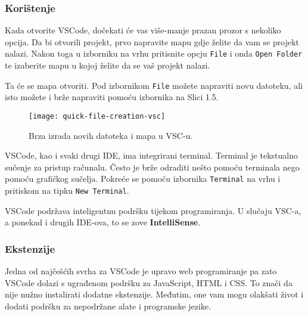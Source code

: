 \subsubsection{Korištenje}

Kada otvorite VSCode, dočekati će vas više-manje prazan prozor s nekoliko opcija.
Da bi otvorili projekt, prvo napravite mapu gdje želite da vam se projekt nalazi.
Nakon toga u izborniku na vrhu pritisnite opcju \verb|File| i onda \verb|Open Folder| te izaberite mapu u kojoj želite da se vaš projekt nalazi.

Ta će se mapa otvoriti.
Pod izbornikom \verb|File| možete napraviti novu datoteku, ali isto možete i brže napraviti pomoću izbornika na Slici 1.5.
\begin{figure}[h]
    \centering
    \texttt{[image: quick-file-creation-vsc]}
    \caption{Brza izrada novih datoteka i mapa u VSC-u.}\label{fig:figure2}
\end{figure}

VSCode, kao i svaki drugi IDE, ima integrirani terminal.
Terminal je tekstualno sučenje za pristup računalu.
Često je brže odraditi nešto pomoću terminala nego pomoću grafičkog sučelja.
Pokreće se pomoću izbornika \verb|Terminal| na vrhu i pritiskom na tipku \verb|New Terminal|.

VSCode podržava inteligentnu podršku tijekom programiranja.
U slučaju VSC-a, a ponekad i drugih IDE-ova, to se zove \textbf{IntelliSense}.


\subsubsection{Ekstenzije}

Jedna od najčešćih svrha za VSCode je upravo web programiranje pa zato VSCode dolazi s ugrađenom podršku za JavaScript, HTML i CSS\@.
To znači da nije nužno instalirati dodatne ekstenzije.
Međutim, one vam mogu olakšati život i dodati podršku za nepodržane alate i programske jezike.

